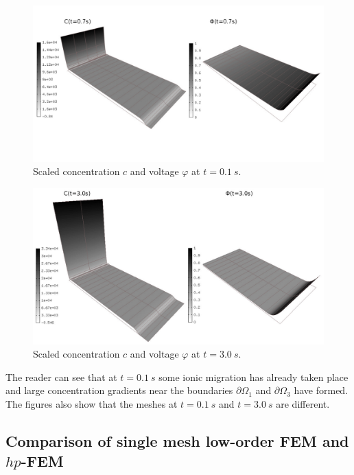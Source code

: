 \begin{figure}[!ht]
  \begin{centering}
  \includegraphics[width=\columnwidth]{cphi-1}
  \caption{\label{fig:cphi-1} Scaled concentration $c$
  and voltage $\varphi$ at $t=0.1\ s$.}
  \end{centering}
\end{figure}


\begin{figure}[!ht]
  \begin{centering}
  \includegraphics[width=\columnwidth]{cphi-2}
  \caption{\label{fig:cphi-2} Scaled concentration $c$
  and voltage $\varphi$ at $t=3.0\ s$.}
  \end{centering}
\end{figure}

The reader can see that at $t=0.1\ s$ some ionic migration has already 
taken place and large concentration gradients near the boundaries $\partial\Omega_1$ 
and $\partial\Omega_3$ have formed. The figures also show that the meshes 
at $t=0.1\ s$ and $t=3.0\ s$ are different. 

\subsection{Comparison of single mesh low-order FEM and $hp$-FEM}

